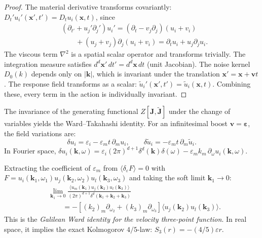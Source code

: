\begin{proof}
The material derivative transforms covariantly: $D_t' u_i'(\mathbf{x}',t') = D_t u_i(\mathbf{x},t)$, since
\begin{equation}
\begin{aligned}
&(\partial_{t'} + u_j'\partial_j')u_i' = (\partial_t - v_j\partial_j)(u_i + v_i) \\
&\qquad + (u_j+v_j)\partial_j(u_i+v_i) = \partial_t u_i + u_j\partial_j u_i.
\end{aligned}
\end{equation}
The viscous term $\nabla^2$ is a spatial scalar operator and transforms trivially. The integration measure satisfies $d^d\mathbf{x}'\,dt' = d^d\mathbf{x}\,dt$ (unit Jacobian). The noise kernel $D_0(k)$ depends only on $|\mathbf{k}|$, which is invariant under the translation $\mathbf{x}'=\mathbf{x}+\mathbf{v}t$. The response field transforms as a scalar: $\tilde{u}_i'(\mathbf{x}',t') = \tilde{u}_i(\mathbf{x},t)$. Combining these, every term in the action is individually invariant.
\end{proof}

The invariance of the generating functional $Z[\mathbf{J},\tilde{\mathbf{J}}]$ under the change of variables yields the Ward--Takahashi identity. For an infinitesimal boost $\mathbf{v}=\boldsymbol{\varepsilon}$, the field variations are:
\begin{equation}
\delta u_i = \varepsilon_i - \varepsilon_m t\,\partial_m u_i, \qquad \delta\tilde{u}_i = -\varepsilon_m t\,\partial_m\tilde{u}_i.
\end{equation}
In Fourier space, $\delta u_i(\mathbf{k},\omega) = \varepsilon_i(2\pi)^{d+1}\delta^{d}(\mathbf{k})\delta(\omega) - \varepsilon_m k_m\,\partial_\omega u_i(\mathbf{k},\omega)$.

Extracting the coefficient of $\varepsilon_m$ from $\langle\delta_\varepsilon F\rangle = 0$ with $F = u_i(\mathbf{k}_1,\omega_1)u_j(\mathbf{k}_2,\omega_2)u_l(\mathbf{k}_3,\omega_3)$ and taking the soft limit $\mathbf{k}_1\to 0$:
\begin{equation}\label{eq:ward_3pt}
\boxed{\begin{aligned}
&\lim_{\mathbf{k}_1\to 0}\frac{\langle u_m(\mathbf{k}_1)u_j(\mathbf{k}_2)u_l(\mathbf{k}_3)\rangle}{(2\pi)^{d+1}\delta^{d}(\mathbf{k}_1+\mathbf{k}_2+\mathbf{k}_3)} \\
&\qquad = -\left[(k_2)_m\partial_{\omega_2}+(k_3)_m\partial_{\omega_3}\right]\langle u_j(\mathbf{k}_2)u_l(\mathbf{k}_3)\rangle.
\end{aligned}}
\end{equation}
This is the \emph{Galilean Ward identity for the velocity three-point function}. In real space, it implies the exact Kolmogorov $4/5$-law: $S_3(r) = -(4/5)\varepsilon r$.

